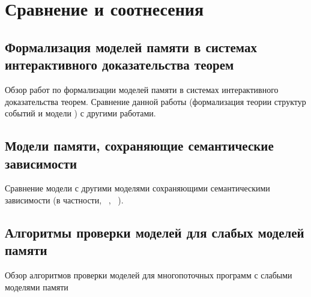 \chapter{Сравнение и соотнесения}
\label{ch:related-work}

\section{Формализация моделей памяти в системах интерактивного доказательства теорем}

Обзор работ по формализации моделей памяти
в системах интерактивного доказательства теорем.
Сравнение данной работы (формализация теории структур событий
и модели \Wkm) с другими работами.

\section{Модели памяти, сохраняющие семантические зависимости}

Сравнение модели \WkmS с другими моделями
сохраняющими семантическими зависимости
(в частности, \Prm~\cite{Kang-al:POPL17}, \PwP~\cite{Jagadeesan-al:OOPSLA2020}).

\section{Алгоритмы проверки моделей для слабых моделей памяти}

Обзор алгоритмов проверки моделей для многопоточных программ 
с слабыми моделями памяти
